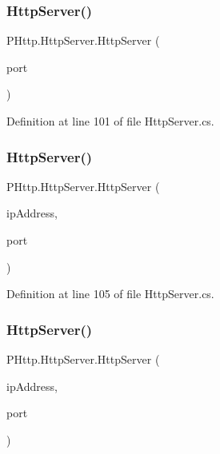 \subsubsection{\texorpdfstring{Http\+Server()}{HttpServer()}\hspace{0.1cm}{\footnotesize\ttfamily [2/4]}}
{\footnotesize\ttfamily P\+Http.\+Http\+Server.\+Http\+Server (\begin{DoxyParamCaption}\item[{int}]{port }\end{DoxyParamCaption})}



Definition at line 101 of file Http\+Server.\+cs.

\mbox{\label{class_p_http_1_1_http_server_aa310a000ee6a0c85249627f9fa0f72c0}} 
\subsubsection{\texorpdfstring{Http\+Server()}{HttpServer()}\hspace{0.1cm}{\footnotesize\ttfamily [3/4]}}
{\footnotesize\ttfamily P\+Http.\+Http\+Server.\+Http\+Server (\begin{DoxyParamCaption}\item[{string}]{ip\+Address,  }\item[{int}]{port }\end{DoxyParamCaption})}



Definition at line 105 of file Http\+Server.\+cs.

\mbox{\label{class_p_http_1_1_http_server_aca038ec73b59bc2ce28ea65072b78288}} 
\subsubsection{\texorpdfstring{Http\+Server()}{HttpServer()}\hspace{0.1cm}{\footnotesize\ttfamily [4/4]}}
{\footnotesize\ttfamily P\+Http.\+Http\+Server.\+Http\+Server (\begin{DoxyParamCaption}\item[{I\+P\+Address}]{ip\+Address,  }\item[{int}]{port }\end{DoxyParamCaption})}



